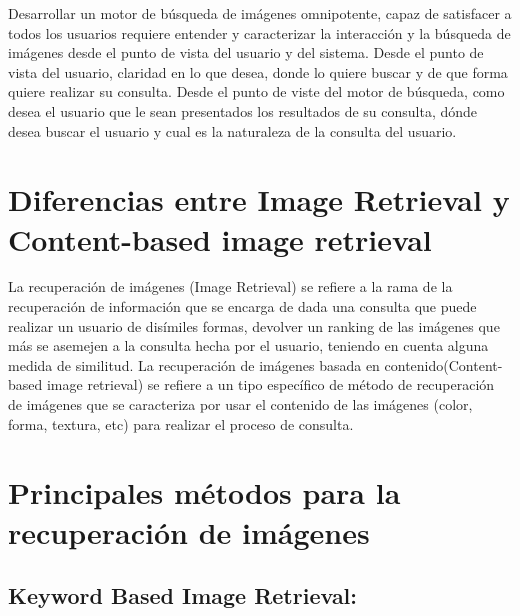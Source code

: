 \documentclass{llncs}
\begin{document}
Desarrollar un motor de búsqueda de imágenes omnipotente, capaz de satisfacer a todos los usuarios 
requiere entender y caracterizar la interacción y la búsqueda de imágenes desde el punto de vista 
del usuario y del sistema. Desde el punto de vista del usuario, claridad en lo que desea, donde lo 
quiere buscar y de que forma quiere realizar su consulta. Desde el punto de viste del motor de 
búsqueda, como desea el usuario que le sean presentados los resultados de su consulta, dónde desea 
buscar el usuario y cual es la naturaleza de la consulta del usuario.


\chapter*{Diferencias entre Image Retrieval y Content-based image retrieval}



La recuperación de imágenes (Image Retrieval) se refiere a la rama de la recuperación de información que se encarga 
de dada una consulta que puede realizar un usuario de disímiles formas, devolver un ranking de las imágenes que más 
se asemejen a la consulta hecha por el usuario, teniendo en cuenta alguna medida de similitud. La recuperación de 
imágenes basada en contenido(Content-based image retrieval) se refiere a un tipo específico de método de recuperación de 
imágenes que se  caracteriza por usar el contenido de las imágenes (color, forma, textura, etc) para realizar el proceso 
de consulta.

\chapter*{Principales m\'etodos para la recuperaci\'on de im\'agenes}

\section{Keyword Based Image Retrieval:}
\end{document}
